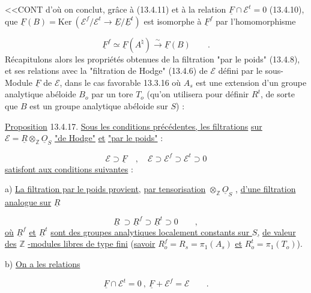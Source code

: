
<<CONT d'où on conclut, grâce à (13.4.11) et à la relation $\underline{F} \cap \mathcal{E}^t = 0$ (13.4.10), que $\underline{F}(B) = \mathrm{Ker}\ (\mathcal{E}^f/\mathcal{E}^t \longrightarrow \underline{E}/\underline{E}^t)$ est isomorphe à $\underline{F}^f$ par l'homomorphisme

\begin{equation}\tag{13.4.16}
\underline{F}^f \simeq \underline{F}(A^\natural) \overset{\sim}{\longrightarrow} \underline{F}(B) \qquad .
\end{equation}
Récapitulons alors les propriétés obtenues de la filtration "par le poids" (13.4.8), et ses relations avec la "filtration de Hodge" (13.4.6) de $\mathcal{E}$ défini par le sous-Module $\underline{F}$ de $\mathcal{E}$, dans le cas favorable 13.3.16 où $A_s$ est une extension d'un groupe analytique abéloide $B_o$ par un tore $T_o$ (qu'on utilisera pour définir $R^t$, de sorte que $B$ est un groupe analytique abéloide sur $S$) :

\underline{Proposition} 13.4.17. \underline{Sous les conditions précédentes, les filtrations} \underline{sur} $\mathcal{E} = \underline{R} \otimes_{\mathbb{Z}} \underline{O}_S$ \underline{"de Hodge"} \underline{et} \underline{"par le poids"} :

\begin{equation}\tag{13.4.17.1}
\mathcal{E} \supset \underline{F} \quad , \quad \mathcal{E} \supset \mathcal{E}^f \supset \mathcal{E}^t \supset 0
\end{equation}
\underline{satisfont aux conditions suivantes} :

a) \underline{La filtration par le poids provient,} \underline{par tensorisation} $\otimes_{\mathbb{Z}} \underline{O}_S$ , \underline{d'une filtration analogue sur} $\underline{R}$

\begin{equation*}
\underline{R} \ \supset \underline{R}^f \supset \underline{R}^t \supset 0 \qquad ,
\end{equation*}
\underline{où} $\underline{R}^f$ \underline{et} $\underline{R}^t$ \underline{sont des groupes analytiques localement constants sur $S$,} \underline{de valeur des} $\mathbb{Z}$ \underline{-modules libres de type fini} (\underline{savoir} $R_o^f = R_s = \pi_1(A_s)$ \underline{et} $R_o^t = \pi_1(T_o)$).

b) \underline{On a les relations}

\begin{equation}\tag{*}
\underline{F} \cap \mathcal{E}^t = 0 \ , \ \underline{F} + \mathcal{E}^f = \mathcal{E} \qquad .
\end{equation}

